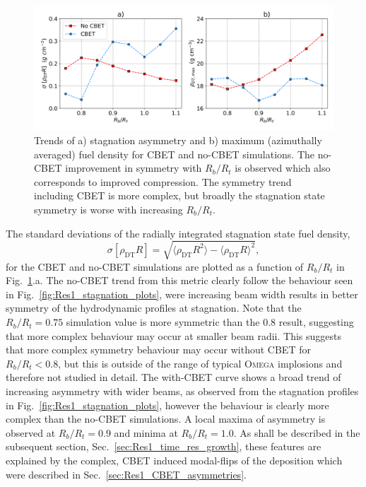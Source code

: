 \begin{figure}[t!]
    \includegraphics[width=1.0\linewidth]{Results1/Images/RbRt_sig_rhomax.png}
    \centering
    \caption{Trends of a) stagnation asymmetry and b) maximum (azimuthally averaged) fuel density for \ac{CBET} and no-\ac{CBET} simulations.
    The no-\ac{CBET} improvement in symmetry with $R_b/R_t$ is observed which also corresponds to improved compression.
    The symmetry trend including \ac{CBET} is more complex, but broadly the stagnation state symmetry is worse with increasing $R_b/R_t$.}%
    \label{fig:Res1_asymm_trend}
\end{figure}

The standard deviations of the radially integrated stagnation state fuel density,
\begin{equation}
    \sigma [\rho_{\text{DT}}R] = \sqrt{ \langle \rho_{\text{DT}}R^2 \rangle - \langle \rho_{\text{DT}}R \rangle^2 },
\end{equation}
for the \ac{CBET} and no-\ac{CBET} simulations are plotted as a function of $R_b/R_t$ in Fig.~\ref{fig:Res1_asymm_trend}.a.
The no-\ac{CBET} trend from this metric clearly follow the behaviour seen in Fig.~\ref{fig:Res1_stagnation_plots}, were increasing beam width results in better symmetry of the hydrodynamic profiles at stagnation.
Note that the $R_b/R_t=0.75$ simulation value is more symmetric than the $0.8$ result, suggesting that more complex behaviour may occur at smaller beam radii.
This suggests that more complex symmetry behaviour may occur without \ac{CBET} for $R_b/R_t<0.8$, but this is outside of the range of typical \textsc{Omega} implosions and therefore not studied in detail.
The with-\ac{CBET} curve shows a broad trend of increasing asymmetry with wider beams, as observed from the stagnation profiles in Fig.~\ref{fig:Res1_stagnation_plots}, however the behaviour is clearly more complex than the no-\ac{CBET} simulations.
A local maxima of asymmetry is observed at $R_b/R_t=0.9$ and minima at $R_b/R_t=1.0$.
As shall be described in the subsequent section, Sec.~\ref{sec:Res1_time_res_growth}, these features are explained by the complex, \ac{CBET} induced modal-flips of the deposition which were described in Sec.~\ref{sec:Res1_CBET_asymmetries}.

